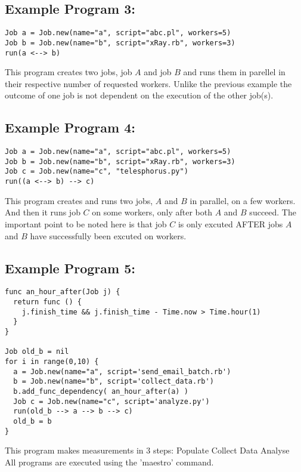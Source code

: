 \subsection*{Example Program 3:}
\begin{verbatim}
Job a = Job.new(name="a", script="abc.pl", workers=5)
Job b = Job.new(name="b", script="xRay.rb", workers=3)
run(a <--> b)
\end{verbatim}

This program creates two jobs, job $A$ and job $B$ and runs them in parellel in their respective number of requested workers.
Unlike the previous example the outcome of one job is not dependent on the execution of the other job(s).
\\

\subsection*{Example Program 4:}
\begin{verbatim}
Job a = Job.new(name="a", script="abc.pl", workers=5)
Job b = Job.new(name="b", script="xRay.rb", workers=3)
Job c = Job.new(name="c", "telesphorus.py")
run((a <--> b) --> c)
\end{verbatim}

This program creates and runs two jobs, $A$ and $B$ in parallel, on a few
workers. And then it runs job $C$ on some workers, only after both $A$
and $B$ succeed. The important point to be noted here is that job $C$ is 
only excuted AFTER jobs $A$ and $B$ have successfully been excuted on workers.
\\

\subsection*{Example Program 5:}
\begin{verbatim}
func an_hour_after(Job j) {
  return func () {
    j.finish_time && j.finish_time - Time.now > Time.hour(1)
  }
}

Job old_b = nil
for i in range(0,10) {
  a = Job.new(name="a", script='send_email_batch.rb')
  b = Job.new(name="b", script='collect_data.rb')
  b.add_func_dependency( an_hour_after(a) )
  Job c = Job.new(name="c", script='analyze.py')
  run(old_b --> a --> b --> c)
  old_b = b
}
\end{verbatim}
This program makes measurements in 3 steps:
Populate
Collect Data
Analyse
\\

All programs are executed using the 'maestro' command.
\\
